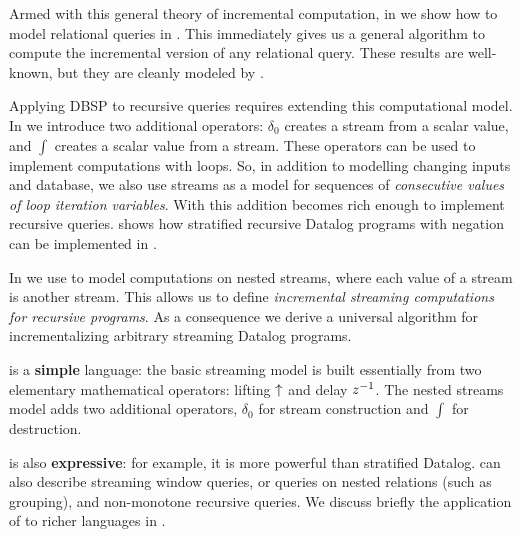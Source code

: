 Armed with this general theory of incremental computation, in 
we show how to model relational queries in \dbsp.  This immediately gives
us a general algorithm to compute the incremental version of any relational query.
These results are well-known, but they are cleanly modeled by \dbsp.

Applying DBSP to recursive queries requires extending this computational model.
In  we introduce two additional operators: $\delta_0$
creates a stream from a scalar value, and $\int$ creates a scalar value from a stream.
These operators can be used to implement computations with  loops.
So, in addition to modelling changing inputs and database, we also
use streams as a model for sequences of \emph{consecutive values of loop
iteration variables}.  With this addition \dbsp becomes rich enough to implement
recursive queries.   shows how stratified recursive
Datalog programs with negation can be implemented in \dbsp.

In  we use \dbsp to model computations on nested streams, where each
value of a stream is another stream.  This allows
us to define \emph{incremental streaming computations for recursive programs}.  As a
consequence we derive a universal algorithm for incrementalizing arbitrary streaming Datalog programs.

\dbsp is a \textbf{simple} language:
the basic  \dbsp streaming model is built essentially from two elementary mathematical operators: lifting $\lift$ and delay $z^{-1}$.
The nested streams model adds two additional operators, $\delta_0$ for stream construction and $\int$ for destruction.

\dbsp is also \textbf{expressive}: for example, it is more powerful than stratified Datalog.
\dbsp can also describe streaming window queries, or queries on nested relations (such as grouping),
and non-monotone recursive queries.
We discuss briefly the application of \dbsp to richer languages in .

